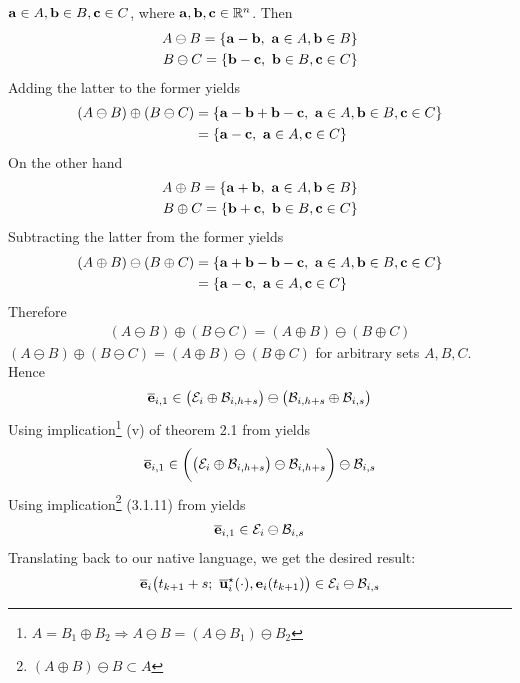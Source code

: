 \begin{gg_box}
{  $\bm{\mathbf{a}} \in A, \bm{\mathbf{b}} \in B, \bm{\mathbf{c}} \in C$, where
  $\bm{\mathbf{a}}, \bm{\mathbf{b}}, \bm{\mathbf{c}} \in \mathbb{R}^n$. Then
\begin{align}
  A \ominus B = \{\bm{\mathbf{a}} - \bm{\mathbf{b}},\ \bm{\mathbf{a}} \in A, \bm{\mathbf{b}} \in B\} \\
  B \ominus C = \{\bm{\mathbf{b}} - \bm{\mathbf{c}},\ \bm{\mathbf{b}} \in B, \bm{\mathbf{c}} \in C\}
\end{align}
Adding the latter to the former yields
\begin{align}
  (A \ominus B) \oplus (B \ominus C)
    &= \{\bm{\mathbf{a}} - \bm{\mathbf{b}} + \bm{\mathbf{b}} - \bm{\mathbf{c}},\ \bm{\mathbf{a}} \in A, \bm{\mathbf{b}} \in B, \bm{\mathbf{c}} \in C\} \\
    &= \{\bm{\mathbf{a}} - \bm{\mathbf{c}},\ \bm{\mathbf{a}} \in A, \bm{\mathbf{c}} \in C\}
\end{align}
On the other hand
\begin{align}
  A \oplus B = \{\bm{\mathbf{a}} + \bm{\mathbf{b}},\ \bm{\mathbf{a}} \in A, \bm{\mathbf{b}} \in B\} \\
  B \oplus C = \{\bm{\mathbf{b}} + \bm{\mathbf{c}},\ \bm{\mathbf{b}} \in B, \bm{\mathbf{c}} \in C\}
\end{align}
Subtracting the latter from the former yields
\begin{align}
  (A \oplus B) \ominus (B \oplus C) &= \{\bm{\mathbf{a}} + \bm{\mathbf{b}} - \bm{\mathbf{b}} - \bm{\mathbf{c}},\ \bm{\mathbf{a}} \in A, \bm{\mathbf{b}} \in B, \bm{\mathbf{c}} \in C\} \\
    &= \{\bm{\mathbf{a}} - \bm{\mathbf{c}},\ \bm{\mathbf{a}} \in A, \bm{\mathbf{c}} \in C\}
\end{align}
Therefore
\begin{align}
  (A \ominus B) \oplus (B \ominus C) = (A \oplus B) \ominus (B \oplus C)
\end{align}
}
$(A \ominus B) \oplus (B \ominus C) = (A \oplus B) \ominus (B \oplus C)$
for arbitrary sets $A,B,C$. Hence
\begin{align}
  \overline{\bm{\mathbf{e}}}_{i,1} \in \big(\mathcal{E}_i \oplus \mathcal{B}_{i,h+s}\big) \ominus \big(\mathcal{B}_{i, h+s} \oplus \mathcal{B}_{i,s}\big)
\end{align}
Using implication\footnote{
$A = B_1 \oplus B_2 \Rightarrow A \ominus B = (A \ominus B_1) \ominus B_2$}
(v) of theorem 2.1 from \cite{kolmanovsky} yields
\begin{align}
  \overline{\bm{\mathbf{e}}}_{i,1} \in \bigg(\big(\mathcal{E}_i \oplus \mathcal{B}_{i,h+s}\big) \ominus \mathcal{B}_{i, h+s}\bigg) \ominus \mathcal{B}_{i,s}
\end{align}
Using implication\footnote{$(A \oplus B) \ominus B \subset A$}
(3.1.11) from \cite{schneider_2013} yields
\begin{align}
  \overline{\bm{\mathbf{e}}}_{i,1} \in \mathcal{E}_i \ominus \mathcal{B}_{i,s}
\end{align}
Translating back to our native language, we get the desired result:
\begin{align}
  \overline{\vect{e}}_i\big(t_{k+1} + s;\ \overline{\vect{u}}_i^{\star}(\cdot), \vect{e}_i(t_{k+1})\big) \in \mathcal{E}_i \ominus \mathcal{B}_{i,s}
\end{align}
\qedsymbol
\end{gg_box}

